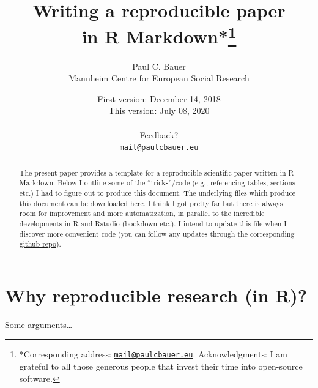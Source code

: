 \documentclass[
  12pt,
]{article}
\title{\vspace{1cm}Writing a reproducible paper\\
in R Markdown*\footnote{*Corresponding address: \href{mailto:mail@paulcbauer.eu}{\nolinkurl{mail@paulcbauer.eu}}. Acknowledgments: I am grateful to all those generous people that invest their time into open-source software.}\vspace{0.5cm}\\}
\author{Paul C. Bauer\\
Mannheim Centre for European Social Research}
\date{First version: December 14, 2018\\
This version: July 08, 2020\\
~\\
Feedback?\\
\href{mailto:mail@paulcbauer.eu}{\nolinkurl{mail@paulcbauer.eu}}\\}
\begin{document}
\maketitle
\begin{abstract}
\noindent{}The present paper provides a template for a reproducible scientific paper written in R Markdown. Below I outline some of the ``tricks''/code (e.g., referencing tables, sections etc.) I had to figure out to produce this document. The underlying files which produce this document can be downloaded \href{https://drive.google.com/drive/folders/1zJP3cNPrHN-gj0rcmbHQgg-XA0hqDXdd?usp=sharing}{here}. I think I got pretty far but there is always room for improvement and more automatization, in parallel to the incredible developments in R and Rstudio (bookdown etc.). I intend to update this file when I discover more convenient code (you can follow any updates through the corresponding \href{https://github.com/paulcbauer/Writing_a_reproducable_paper_in_rmarkdown/}{github repo}).\vspace{.8cm}
\end{abstract}

\clearpage

\renewcommand{\baselinestretch}{0.5}\normalsize
\tableofcontents
\renewcommand{\baselinestretch}{1.1}\normalsize

\clearpage

\hypertarget{why-reproducible-research-in-r}{%
\section{Why reproducible research (in R)?}\label{why-reproducible-research-in-r}}

Some arguments\ldots{}
\end{document}
